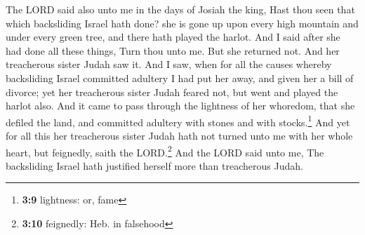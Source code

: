  The LORD said also unto me in the days of Josiah the
king, Hast thou seen that which backsliding Israel hath done? she is
gone up upon every high mountain and under every green tree, and there
hath played the harlot.  And I said after she had done all
these things, Turn thou unto me. But she returned not. And her
treacherous sister Judah saw it.  And I saw, when for all
the causes whereby backsliding Israel committed adultery I had put her
away, and given her a bill of divorce; yet her treacherous sister Judah
feared not, but went and played the harlot also.  And it
came to pass through the lightness of her whoredom, that she defiled the
land, and committed adultery with stones and with stocks.\footnote{\textbf{3:9}
  lightness: or, fame}  And yet for all this her
treacherous sister Judah hath not turned unto me with her whole heart,
but feignedly, saith the LORD.\footnote{\textbf{3:10} feignedly: Heb. in
  falsehood}  And the LORD said unto me, The backsliding
Israel hath justified herself more than treacherous Judah.

